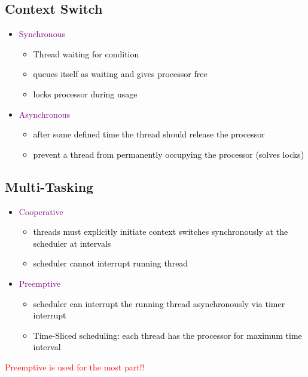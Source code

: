 \documentclass[main.tex,fontsize=8pt,paper=a4,paper=portrait,DIV=calc,]{scrartcl}
\begin{document}
\subsection{Context Switch}
\begin{itemize}
\item \textcolor{purple}{Synchronous}
  \begin{itemize}
  \item \textcolor{black}{Thread waiting for condition}
  \item \textcolor{black}{queues itself as waiting and gives processor free}
  \item \textcolor{black}{locks processor during usage}
  \end{itemize} 
\item \textcolor{purple}{Asynchronous}
  \begin{itemize}
  \item \textcolor{black}{after some defined time the thread should release the processor}
  \item \textcolor{black}{prevent a thread from permanently occupying the processor (solves locks)}
  \end{itemize} 
\end{itemize} 

\subsection{Multi-Tasking}
\begin{itemize}
\item \textcolor{purple}{Cooperative}
  \begin{itemize}
  \item \textcolor{black}{threads must explicitly initiate context switches synchronously at the scheduler at intervals}
  \item \textcolor{black}{scheduler cannot interrupt running thread}
  \end{itemize} 
\item \textcolor{purple}{Preemptive}
  \begin{itemize}
  \item \textcolor{black}{scheduler can interrupt the running thread asynchronously via timer interrupt}
  \item \textcolor{black}{Time-Sliced scheduling: each thread has the processor for maximum time interval}
  \end{itemize} 
\end{itemize} 
\textcolor{red}{Preemptive is used for the most part!!}
\end{document}
